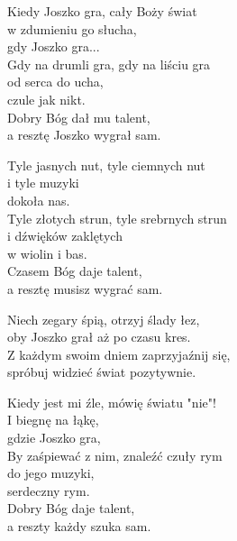 \begin{text}
    Kiedy Joszko gra, cały Boży świat\\
    w zdumieniu go słucha,\\
    gdy Joszko gra...\\
    Gdy na drumli gra, gdy na liściu gra\\
    od serca do ucha,\\
    czule jak nikt.\\
    Dobry Bóg dał mu talent,\\
    a resztę Joszko wygrał sam.

    Tyle jasnych nut, tyle ciemnych nut\\
    i tyle muzyki\\
    dokoła nas.\\
    Tyle złotych strun, tyle srebrnych strun\\
    i dźwięków zaklętych\\
    w wiolin i bas.\\
    Czasem Bóg daje talent,\\
    a resztę musisz wygrać sam.

    \vin Niech zegary śpią, otrzyj ślady łez,\\
    \vin oby Joszko grał aż po czasu kres.\\
    \vin Z każdym swoim dniem zaprzyjaźnij się,\\
    \vin spróbuj widzieć świat pozytywnie.

    Kiedy jest mi źle, mówię światu "nie"!\\
    I biegnę na łąkę,\\
    gdzie Joszko gra,\\
    By zaśpiewać z nim, znaleźć czuły rym\\
    do jego muzyki,\\
    serdeczny rym.\\
    Dobry Bóg daje talent,\\
    a reszty każdy szuka sam.
\end{text}
